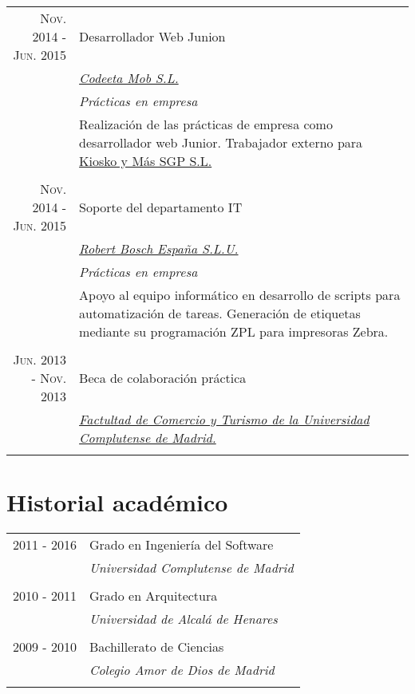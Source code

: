 \documentclass[a4paper,10pt]{article}
\begin{document}
\begin{tabular}{r|p{11cm}}
 	\textsc{Nov. 2014 - Jun. 2015} & 	Desarrollador Web Junion \\&
	\emph{\href{https://codeeta.com/}{Codeeta Mob S.L.}}\\&
	\emph{Prácticas en empresa}\\&
	\footnotesize{
		Realización de las prácticas de empresa como desarrollador web Junior.\newline
		Trabajador externo para \href{https://www.kioskoymas.com}{Kiosko y Más SGP S.L.}
	}
	\\\multicolumn{2}{c}{} \\

 	\textsc{Nov. 2014 - Jun. 2015} & 	Soporte del departamento IT \\&
	\emph{\href{https://www.grupo-bosch.es/}{Robert Bosch España S.L.U.}}\\&
	\emph{Prácticas en empresa}\\&
	\footnotesize{
		Apoyo al equipo informático en desarrollo de scripts para automatización de tareas.	\newline
		Generación de etiquetas mediante su programación ZPL para impresoras Zebra.
	}
	\\\multicolumn{2}{c}{} \\

 	\textsc{Jun. 2013 - Nov. 2013} & 	Beca de colaboración práctica \\&
	\emph{\href{https://comercioyturismo.ucm.es/}{Factultad de Comercio y Turismo de la Universidad Complutense de Madrid.}}\\&

\end{tabular}

\section{Historial académico}
\begin{tabular}{rl}	
	\textsc{2011 - 2016}& Grado en Ingeniería del Software\\&
	\small\emph{Universidad Complutense de Madrid}\\&\\

	\textsc{2010 - 2011}& Grado en Arquitectura\\&
	\small\emph{Universidad de Alcalá de Henares}\\&\\

	\textsc{2009 - 2010}& Bachillerato de Ciencias\\&
	\small\emph{Colegio Amor de Dios de Madrid}\\&\\
\end{tabular}
\end{document}
